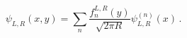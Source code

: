 \begin{equation}
\psi_{L,R}(x,y)=\sum_n \frac{f_n^{L,R}(y)}{\sqrt{2 \pi R}}
\psi^{(n)}_{L,R}(x) \, .
\end{equation}

